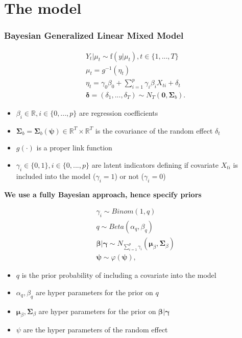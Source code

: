 \documentclass{beamer}
\begin{document}
\section{The model} 


\begin{frame}

\frametitle{Bayesian Generalized Linear Mixed Model}

\begin{eqnarray} \label{themodeleq}
  &Y_t|\mu_t \sim  \text{f}(y|\mu_t), t \in \{1,...,T\}\\
  &\mu_t = g^{-1}\left(\eta_t\right) \\
  & \eta_t = \gamma_0\beta_0 + \sum_{i=1}^{p} \gamma_i\beta_{i}X_{ti} + \delta_t\\
 &\boldsymbol{\delta} = (\delta_1,...,\delta_T) \sim N_T\left(\boldsymbol{0},\boldsymbol{\Sigma}_b\right).
\end{eqnarray}

\begin{itemize}
\item  $\beta_i \in \mathbb{R}, i \in \{0,...,p\}$ are regression coefficients
\item $\boldsymbol{\Sigma}_b = \boldsymbol{\Sigma}_b\left(\boldsymbol{\psi}\right) \in \mathbb{R}^T\times\mathbb{R}^T$ is the covariance of the random effect $\delta_t$ 
\item $g(\cdot)$ is a proper link function
\item $\gamma_i\in\{0,1\}, i \in \{0,...,p\}$ are latent indicators  defining if covariate $X_{ti}$ is  included into the model ($\gamma_i = 1$) or not ($\gamma_i = 0$)
\end{itemize}


\end{frame}


\begin{frame}
\begin{center}
\textbf{We use a fully Bayesian approach, hence specify priors}
\end{center}
\begin{eqnarray}
&\gamma_i \sim Binom(1,q)\label{glmgammaprior}\\
&q \sim Beta(\alpha_q,\beta_q)\label{glmgammahyperprior}
\\	
&\boldsymbol\beta|\boldsymbol\gamma \sim N_{\sum_{i=1}^p{\gamma_i}}(\boldsymbol\mu_\beta,\boldsymbol\Sigma_{\beta})\label{glmbetarprior}\\
&\boldsymbol{\psi}\sim\varphi(\boldsymbol{\psi}),\label{latentprior}
\end{eqnarray}

\begin{itemize}
\item $q$ is the prior probability of including a covariate into the model
\item $\alpha_q,\beta_q$ are hyper parameters for the prior on $q$
\item $\boldsymbol\mu_\beta,\boldsymbol\Sigma_{\beta}$ are hyper parameters for the prior on $\boldsymbol\beta|\boldsymbol\gamma$
\item $\psi$ are the hyper parameters of the random effect
\end{itemize}
\end{frame}
\end{document}
